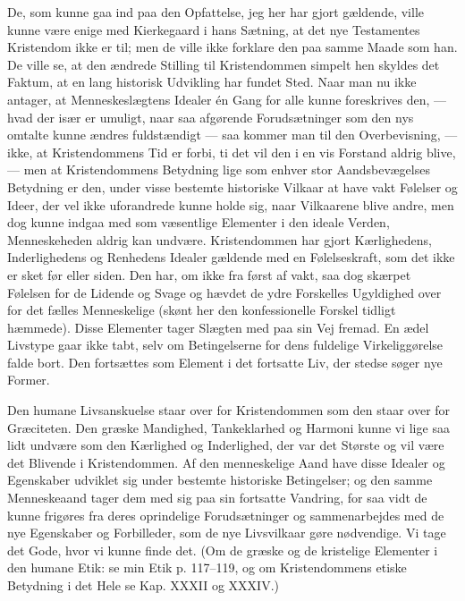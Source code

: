 \documentclass[12pt,a4paper,openany]{book}
\newcommand{\opage}[1]{\marginnote{\footnotesize\textit{[#1]}}}
\begin{document}
De, som kunne gaa ind paa den Opfattelse, jeg her
har gjort gældende, ville kunne være enige med Kierkegaard
i hans Sætning, at det nye Testamentes Kristendom
ikke er til; men de ville ikke forklare den paa
samme Maade som han. De ville se, at den ændrede
Stilling til Kristendommen simpelt hen skyldes det Faktum,
at en lang historisk Udvikling har fundet Sted. Naar
man nu ikke antager, at Menneskeslægtens Idealer én
Gang for alle kunne foreskrives den, --- hvad der især
er umuligt, naar saa afgørende Forudsætninger som den
nys omtalte kunne ændres fuldstændigt --- saa kommer
man til den Overbevisning, --- ikke, at Kristendommens
Tid er forbi, ti det vil den i en vis Forstand aldrig blive,
--- men at Kristendommens Betydning lige som enhver
stor Aandsbevægelses Betydning er den, under visse bestemte
historiske Vilkaar at have vakt Følelser og Ideer,
der vel ikke uforandrede kunne holde sig, naar Vilkaarene
blive andre, men dog kunne indgaa med som væsentlige
Elementer i den ideale Verden, Menneskeheden aldrig
\opage{156}kan undvære. Kristendommen har gjort Kærlighedens,
Inderlighedens og Renhedens Idealer gældende med en
Følelseskraft, som det ikke er sket før eller siden. Den
har, om ikke fra først af vakt, saa dog skærpet Følelsen
for de Lidende og Svage og hævdet de ydre Forskelles
Ugyldighed over for det fælles Menneskelige (skønt her
den konfessionelle Forskel tidligt hæmmede). Disse Elementer
tager Slægten med paa sin Vej fremad. En ædel
Livstype gaar ikke tabt, selv om Betingelserne for dens
fuldelige Virkeliggørelse falde bort. Den fortsættes som
Element i det fortsatte Liv, der stedse søger nye Former.

Den humane Livsanskuelse staar over for Kristendommen
som den staar over for Græciteten. Den græske
Mandighed, Tankeklarhed og Harmoni kunne vi lige saa
lidt undvære som den Kærlighed og Inderlighed, der var
det Største og vil være det Blivende i Kristendommen.
Af den menneskelige Aand have disse Idealer og Egenskaber
udviklet sig under bestemte historiske Betingelser;
og den samme Menneskeaand tager dem med sig paa sin
fortsatte Vandring, for saa vidt de kunne frigøres fra
deres oprindelige Forudsætninger og sammenarbejdes med
de nye Egenskaber og Forbilleder, som de nye Livsvilkaar
gøre nødvendige. Vi tage det Gode, hvor vi kunne
finde det. (Om de græske og de kristelige Elementer i
den humane Etik: se min Etik p. 117--119, og om
Kristendommens etiske Betydning i det Hele se Kap.
XXXII og XXXIV.)
\end{document}
